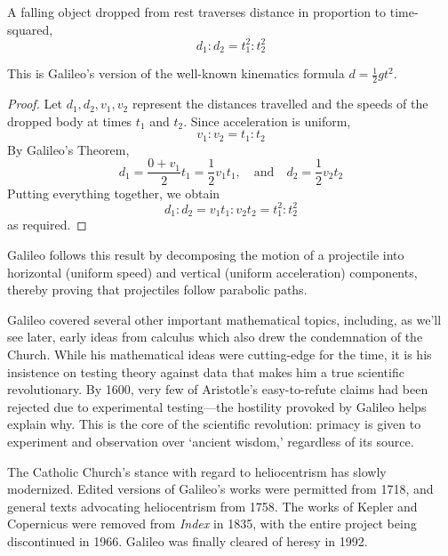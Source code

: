 \begin{cor*}{}{}
	A falling object dropped from rest traverses distance in proportion to time-squared,
	\[
		d_1:d_2=t_1^2:t_2^2
	\]
\end{cor*}

This is Galileo's version of the well-known kinematics formula $d=\frac 12gt^2$.

\begin{proof}
	Let $d_1,d_2,v_1,v_2$ represent the distances travelled and the speeds of the dropped body at times $t_1$ and $t_2$. Since acceleration is uniform,
	\[
		v_1:v_2=t_1:t_2
	\]
	By Galileo's Theorem,
	\[
		d_1=\frac{0+v_1}2t_1=\frac 12v_1t_1,
		\quad\text{and}\quad
		d_2=\frac 12v_2t_2
	\]
	Putting everything together, we obtain
	\[
		d_1:d_2=v_1t_1:v_2t_2=t_1^2:t_2^2%
	\]
	as required.
\end{proof}

Galileo follows this result by decomposing the motion of a projectile into horizontal (uniform speed) and vertical (uniform acceleration) components, thereby proving that projectiles follow parabolic paths.
\medbreak

Galileo covered several other important mathematical topics, including, as we'll see later, early ideas from calculus which also drew the condemnation of the Church. While his mathematical ideas were cutting-edge for the time, it is his insistence on testing theory against data that makes him a true scientific revolutionary. By 1600, very few of Aristotle's easy-to-refute claims had been rejected due to experimental testing---the hostility provoked by Galileo helps explain why. This is the core of the scientific revolution: primacy is given to experiment and observation over `ancient wisdom,' regardless of its source.
\bigbreak

The Catholic Church's stance with regard to heliocentrism has slowly modernized. Edited versions of Galileo's works were permitted from 1718, and general texts advocating heliocentrism from 1758. The works of Kepler and Copernicus were removed from \emph{Index} in 1835, with the entire project being discontinued in 1966. Galileo was finally cleared of heresy in 1992.

\clearpage


